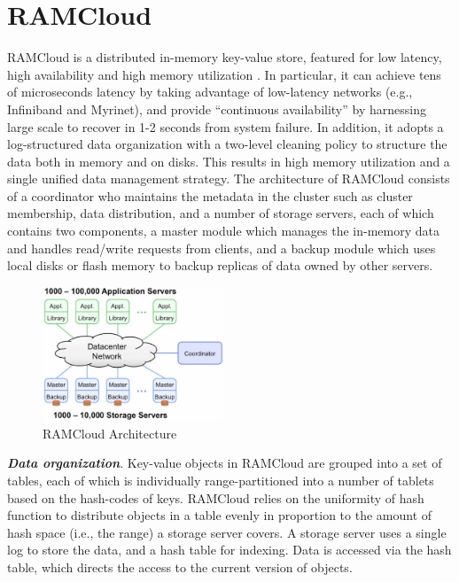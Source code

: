 \documentclass[twocolumn]{article}
\begin{document}
\section{RAMCloud}
RAMCloud is a distributed in-memory key-value store, featured for low latency, high availability and high memory utilization \cite{Ousterhout:2015}. In particular, it can achieve tens of microseconds latency
by taking advantage of low-latency networks (e.g., Infiniband and
Myrinet), and provide ``continuous availability'' by harnessing large
scale to recover in 1-2 seconds from system failure. In addition, it
adopts a log-structured data organization with a two-level cleaning
policy to structure the data both in memory and on disks. This results
in high memory utilization and a single unified data management
strategy. The architecture of RAMCloud consists of a coordinator who
maintains the metadata in the cluster such as cluster membership, data
distribution, and a number of storage servers, each of which contains
two components, a master module which manages the in-memory data and
handles read/write requests from clients, and a backup module which uses
local disks or flash memory to backup replicas of data owned by other
servers.

\begin{figure}[htb]
        \centering
        \includegraphics[width=0.48\textwidth]{architecture_ramcloud.png}
        \caption{RAMCloud Architecture}
        \label{fig:ramcloud_architecture}
\end{figure}

\noindent
\textbf{\emph{Data organization}}. Key-value objects in RAMCloud are grouped into
a set of tables, each of which is individually range-partitioned into a
number of tablets based on the hash-codes of keys. RAMCloud relies on
the uniformity of hash function to distribute objects in a table evenly
in proportion to the amount of hash space (i.e., the range) a storage
server covers. A storage server uses a single log to store the data, and
a hash table for indexing. Data is accessed via the hash table, which
directs the access to the current version of objects.
\end{document}
